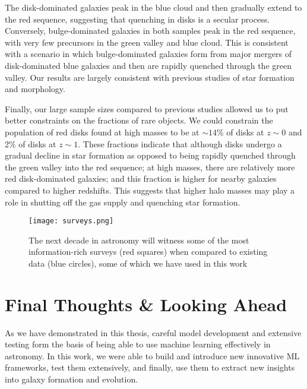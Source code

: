 The disk-dominated galaxies peak in the blue cloud and then gradually extend to the red sequence, suggesting that quenching in disks is a secular process. Conversely, bulge-dominated galaxies in both samples peak  in  the  red  sequence,  with  very few precursors in the green valley and blue cloud. This is consistent with a scenario in which bulge-dominated galaxies form from major mergers of disk-dominated blue galaxies and then are rapidly quenched through the green valley. Our results are largely consistent with previous studies of star formation and morphology.

Finally, our large sample sizes compared to previous studies allowed us to put better constraints on the fractions of rare objects. We could constrain the population of red disks found at high masses to be at $\sim14$\% of disks at $z\sim0$ and 2\% of disks at $z \sim 1$. These fractions indicate that although disks undergo a gradual decline in star formation as opposed to being rapidly quenched through the green valley into the red sequence; at high masses, there are relatively more red disk-dominated galaxies; and this fraction is higher for nearby galaxies compared to higher redshifts. This suggests that higher halo masses may play a role in shutting off the gas supply and quenching star formation. 

\begin{wrapfigure}{R}{0.45\textwidth}
\centering
\vspace{-0.3in}
\texttt{[image: surveys.png]}
\vspace{-0.3in}
\caption{ The next decade in astronomy will witness some of the most information-rich surveys (red squares) when compared to existing data (blue circles), some of which we have used in this work}
\label{fig:surveys}
\vspace{-0.2in}
\end{wrapfigure}


\section{Final Thoughts \& Looking Ahead} \label{sec_conc:future}
As we have demonstrated in this thesis, careful model development and extensive testing form the basis of being able to use machine learning effectively in astronomy. In this work, we were able to build and introduce new innovative ML frameworks, test them extensively, and finally, use them to extract new insights into galaxy formation and evolution.

